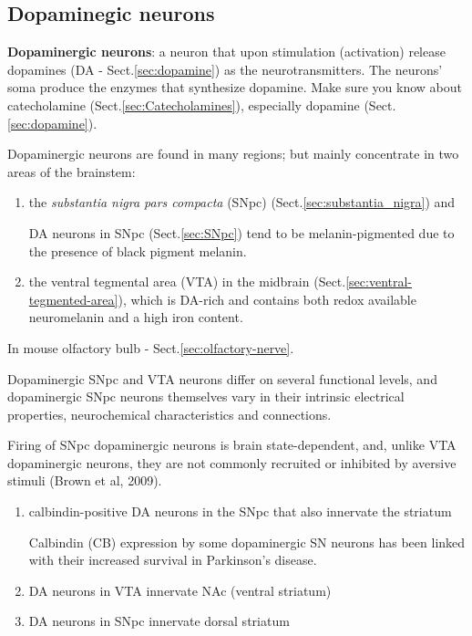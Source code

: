 \subsection{Dopaminegic neurons}
\label{sec:dopaminegic_neurons}


{\bf Dopaminergic neurons}: a neuron that upon stimulation (activation) release
dopamines (DA - Sect.\ref{sec:dopamine}) as the neurotransmitters. The neurons' soma
produce the enzymes that synthesize dopamine. Make sure you know about catecholamine
(Sect.\ref{sec:Catecholamines}), especially dopamine (Sect.\ref{sec:dopamine}).
 
Dopaminergic neurons are found in many regions; but mainly concentrate in two
areas of the brainstem: 
\begin{enumerate}
  \item  the {\it substantia nigra pars compacta} (SNpc)
  (Sect.\ref{sec:substantia_nigra}) and 

DA neurons in SNpc (Sect.\ref{sec:SNpc}) tend to be melanin-pigmented due to the
presence of black pigment melanin.
  
  \item the ventral tegmental area (VTA) in the midbrain
  (Sect.\ref{sec:ventral-tegmented-area}), which is DA-rich and contains both redox available
  neuromelanin and a high iron content. 
  
\end{enumerate}
In mouse olfactory bulb - Sect.\ref{sec:olfactory-nerve}.

Dopaminergic SNpc and VTA neurons differ on several functional levels, and
dopaminergic SNpc neurons themselves vary in their intrinsic electrical
properties, neurochemical characteristics and connections.

Firing of SNpc dopaminergic neurons is brain state-dependent, and, unlike
VTA dopaminergic neurons, they are not commonly recruited or inhibited by
aversive stimuli (Brown et al, 2009).

\begin{enumerate}
  \item calbindin-positive DA neurons in the SNpc that also innervate the
  striatum
  
Calbindin (CB) expression by some dopaminergic SN neurons has been linked with
their increased survival in Parkinson's disease.
  
  \item DA neurons in VTA innervate NAc (ventral striatum)
  \item DA neurons in SNpc innervate dorsal striatum
\end{enumerate}

